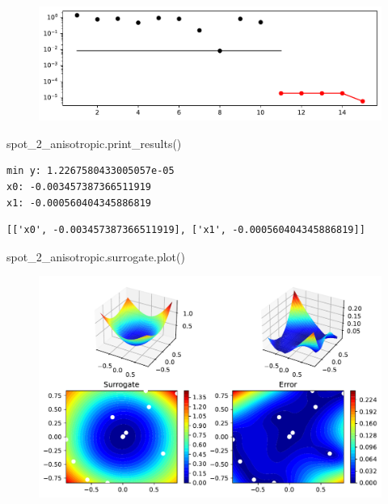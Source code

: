 \documentclass[
  letterpaper,
  DIV=11,
  numbers=noendperiod]{scrreprt}
\newenvironment{Shaded}{\begin{snugshade}}{\end{snugshade}}
\newcommand{\NormalTok}[1]{\textcolor[rgb]{0.00,0.23,0.31}{#1}}
\begin{document}
\begin{figure}[H]

{\centering \includegraphics{009_num_spot_anisotropic_files/figure-pdf/cell-9-output-1.pdf}

}

\end{figure}

\begin{Shaded}
\begin{Highlighting}[]
\NormalTok{spot\_2\_anisotropic.print\_results()}
\end{Highlighting}
\end{Shaded}

\begin{verbatim}
min y: 1.2267580433005057e-05
x0: -0.003457387366511919
x1: -0.000560404345886819
\end{verbatim}

\begin{verbatim}
[['x0', -0.003457387366511919], ['x1', -0.000560404345886819]]
\end{verbatim}

\begin{Shaded}
\begin{Highlighting}[]
\NormalTok{spot\_2\_anisotropic.surrogate.plot()}
\end{Highlighting}
\end{Shaded}

\begin{figure}[H]

{\centering \includegraphics{009_num_spot_anisotropic_files/figure-pdf/cell-11-output-1.pdf}

}

\end{figure}
\end{document}
